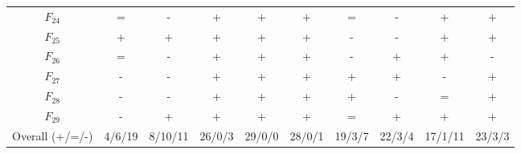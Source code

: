 \begin{center}
\begin{longtable}{cccccccccc}
$F_{24}$ & = & - & + & + & + & = & - & + & + \\
$F_{25}$ & + & + & + & + & + & - & - & + & + \\
$F_{26}$ & = & - & + & + & + & - & + & + & - \\
$F_{27}$ & - & - & + & + & + & + & + & - & + \\
$F_{28}$ & - & - & + & + & + & + & - & = & + \\
$F_{29}$ & - & + & + & + & + & = & + & + & + \\
\midrule
Overall (+/=/-) & 4/6/19 & 8/10/11 & 26/0/3 & 29/0/0 & 28/0/1 & 19/3/7 & 22/3/4 & 17/1/11 & 23/3/3 \\
\bottomrule
\end{longtable}
\end{center}